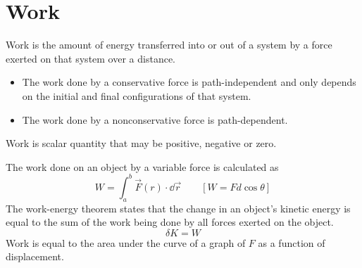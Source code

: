 \documentclass[../mech.tex]{subfiles}
\begin{document}
\section{Work}
Work is the amount of energy transferred into or out of a system by a force exerted on that system over a distance.
\begin{itemize}
    \item The work done by a conservative force is path-independent and only depends on the initial and final configurations of that system.
    \item The work done by a nonconservative force is path-dependent.
\end{itemize}

Work is scalar quantity that may be positive, negative or zero.

The work done on an object by a variable force is calculated as 
\[ W=\int_a^b \vec{F}(r)\cdot \dd \vec{r} \qquad [W=Fd\cos\theta] \]
The work-energy theorem states that the change in an object's kinetic energy is equal to the sum of the work being done by all forces exerted on the object.
\[ \delta K = W \]
Work is equal to the area under the curve of a graph of $F$ as a function of displacement.
\medbreak
\end{document}
